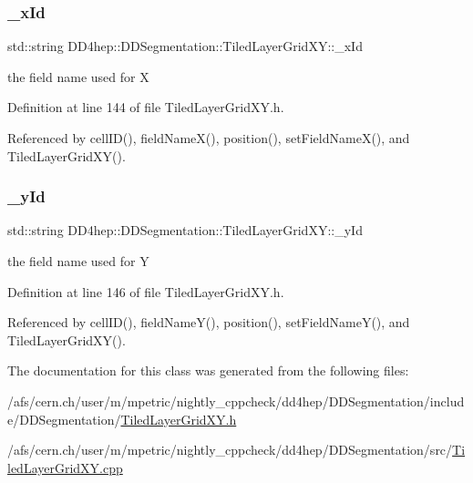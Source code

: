 \subsubsection{\texorpdfstring{\+\_\+x\+Id}{\_xId}}
{\footnotesize\ttfamily std\+::string D\+D4hep\+::\+D\+D\+Segmentation\+::\+Tiled\+Layer\+Grid\+X\+Y\+::\+\_\+x\+Id\hspace{0.3cm}{\ttfamily [protected]}}



the field name used for X 



Definition at line 144 of file Tiled\+Layer\+Grid\+X\+Y.\+h.



Referenced by cell\+I\+D(), field\+Name\+X(), position(), set\+Field\+Name\+X(), and Tiled\+Layer\+Grid\+X\+Y().

\hypertarget{class_d_d4hep_1_1_d_d_segmentation_1_1_tiled_layer_grid_x_y_abcbef3de34c9e92a82bd8a6a5621aa63}{}\label{class_d_d4hep_1_1_d_d_segmentation_1_1_tiled_layer_grid_x_y_abcbef3de34c9e92a82bd8a6a5621aa63} 
\subsubsection{\texorpdfstring{\+\_\+y\+Id}{\_yId}}
{\footnotesize\ttfamily std\+::string D\+D4hep\+::\+D\+D\+Segmentation\+::\+Tiled\+Layer\+Grid\+X\+Y\+::\+\_\+y\+Id\hspace{0.3cm}{\ttfamily [protected]}}



the field name used for Y 



Definition at line 146 of file Tiled\+Layer\+Grid\+X\+Y.\+h.



Referenced by cell\+I\+D(), field\+Name\+Y(), position(), set\+Field\+Name\+Y(), and Tiled\+Layer\+Grid\+X\+Y().



The documentation for this class was generated from the following files\+:\begin{DoxyCompactItemize}
\item 
/afs/cern.\+ch/user/m/mpetric/nightly\+\_\+cppcheck/dd4hep/\+D\+D\+Segmentation/include/\+D\+D\+Segmentation/\hyperlink{_tiled_layer_grid_x_y_8h}{Tiled\+Layer\+Grid\+X\+Y.\+h}\item 
/afs/cern.\+ch/user/m/mpetric/nightly\+\_\+cppcheck/dd4hep/\+D\+D\+Segmentation/src/\hyperlink{_tiled_layer_grid_x_y_8cpp}{Tiled\+Layer\+Grid\+X\+Y.\+cpp}\end{DoxyCompactItemize}
